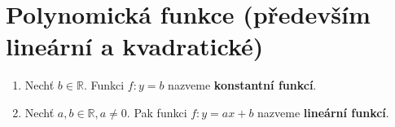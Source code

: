 \section{Polynomická funkce (především lineární a kvadratické)}

\begin{definition}
\begin{enumerate}
  \item Nechť $b \in \mathbb R$. Funkci $f:y = b$ nazveme \textbf{konstantní funkcí}.
  \item Nechť $a, b \in \mathbb R, a \neq 0$. Pak funkci $f:y= ax + b$ nazveme \textbf{lineární funkcí}. 
\end{enumerate}
\end{definition}

